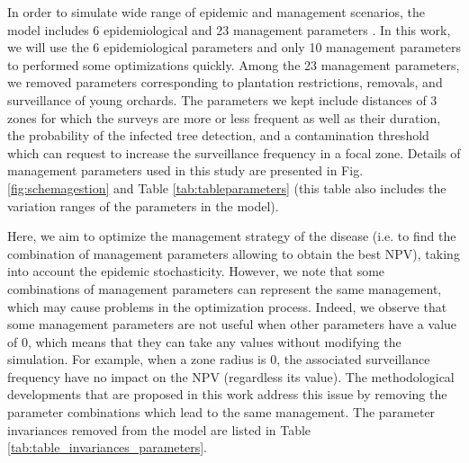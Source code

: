 In order to simulate wide range of epidemic and management scenarios, the model includes 6 epidemiological and 23 management parameters \cite{rimbaud2018heuristic,picard2018}. 
In this work, we will use the 6 epidemiological parameters and only 10 management parameters to performed some optimizations quickly. Among the 23 management parameters, we removed parameters corresponding to plantation restrictions, removals, and surveillance of young orchards.
The parameters we kept include distances of 3 zones for which the surveys are more or less frequent as well as their duration, the probability of the infected tree detection, 
and a contamination threshold which can request to increase the surveillance frequency in a focal zone. 
Details of management parameters used in this study are presented in Fig.\ref{fig:schemagestion} and Table \ref{tab:tableparameters} 
(this table also includes the variation ranges of the parameters in the model).

Here, we aim to optimize the management strategy of the disease (i.e. to find the combination of management parameters allowing to obtain the best NPV), 
taking into account the epidemic stochasticity. However, we note that some combinations of management parameters can represent the same management, 
which may cause problems in the optimization process. Indeed, we observe that some management parameters are not useful when other parameters have a value of 0, 
which means that they can take any values without modifying the simulation. For example, when a zone radius is 0, the associated surveillance frequency have no impact on the NPV (regardless its value). 
The methodological developments that are proposed in this work address this issue by removing the parameter combinations which lead to the same management. 
The parameter invariances removed from the model are listed in Table \ref{tab:table_invariances_parameters}.

